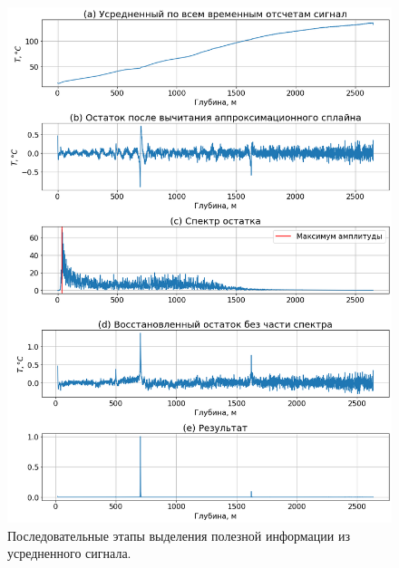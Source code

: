 \begin{figure}[H]
\centering
\includegraphics[width=1.0\textwidth]{PLT/leakage_results.png}
\caption{Последовательные этапы выделения полезной информации из усредненного сигнала.}
\label{fig:leakage_results}
\end{figure}